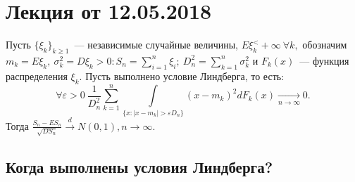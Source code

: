 
	\section{Лекция от 12.05.2018}
	\begin{theorem}[Линдберга(б/д)]
		Пусть \(\{\xi_k\}_{k \geqslant 1}\)~--- независимые случайные величины, \(E\xi_k^ < +\infty ~ \forall k,\) обозначим \(m_k = E\xi_k, ~\sigma^2_k = D\xi_k > 0: S_n = \sum\limits_{i = 1}^{n}\xi_i; ~ D_n^2 = \sum\limits_{k = 1}^{n}\sigma^2_k\) и \(F_k(x)\)~--- функция распределения \(\xi_k\). Пусть выполнено условие Линдберга, то есть:
		\[
			\forall \varepsilon > 0 ~ \frac{1}{D^2_n} \sum\limits_{k = 1}^{n} \int\limits_{\{x:|x - m_k| > \varepsilon D_n\}}(x-m_k)^2 dF_k(x) \underset{n \to \infty}{\longrightarrow} 0.
		\]
		Тогда \( \frac{S_n - ES_n}{\sqrt{DS_n}} \overset{d}{\longrightarrow} N(0,1), n\to \infty\).
	\end{theorem}

	\subsection{Когда выполнены условия Линдберга?}

